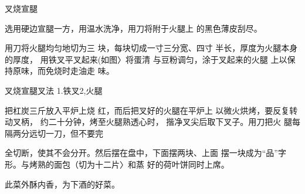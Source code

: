 \begin{recipe}{叉烧宣腿}

\ingredients


\cooking

\step 选用硬边宣腿一方，用温水洗净，用刀将附于火腿上 的黑色薄皮刮尽。

\step 用刀将火腿均匀地切为三 块，每块切成一寸三分宽、四寸 半长，厚度为火腿本身的厚度， 用铁叉平叉起来(如图〉将蛋清 与豆粉调匀，涂于叉起来的火腿 上以保持原味，而免烧时走油走 味。

叉烧宣腿叉法 1.铁叉2,火腿

\step 把杠炭三斤放入平炉上烧 红，而后把叉好的火腿在平炉上 以微火烘烤，要反复转动叉柄， 约二十分钟，烤至火腿熟透心时， 揩净叉尖后取下叉子。用刀把火 腿每隔两分远切一刀，但不要完

全切断，使其不会分开。然后摆在盘中，下面摆两块、上面 摆一块成为“品”字形。与烤熟的面包（切为十二片〉和蒸 好的荷叶饼同时上席。

\notes

此菜外酥内香，为下酒的好菜。

\end{recipe}

